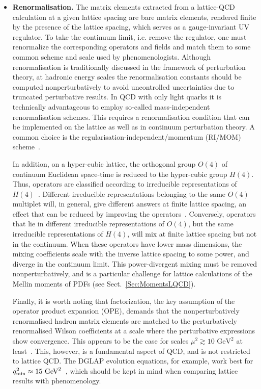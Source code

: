 \begin{itemize}
\item {\bfseries Renormalisation.} The matrix elements extracted from a 
lattice-QCD calculation at a given lattice spacing are bare matrix elements,
rendered finite by the presence of the lattice spacing, which serves
as a gauge-invariant UV regulator. To take the continuum limit,
i.e. remove the regulator, one must renormalize the corresponding
operators and fields and match them to some common scheme and scale used 
by phenomenologists. Although renormalisation is traditionally
discussed in the framework of perturbation theory, at hadronic energy
scales the renormalisation constants should be computed
nonperturbatively to avoid uncontrolled uncertainties due to 
truncated perturbative results.
%
In QCD with only light quarks it is technically
advantageous to employ so-called mass-independent renormalisation
schemes.
%
This requires a renormalisation condition that can be
implemented on the lattice as well as in continuum perturbation
theory. A common choice is the regularisation-independent/momentum (RI/MOM) 
scheme~\cite{Martinelli:1994ty}.

In addition, on a hyper-cubic lattice, the orthogonal group $O(4)$ of
continuum Euclidean space-time is reduced to the hyper-cubic group
$H(4)$.
%
Thus, operators are classified according to irreducible
representations of $H(4)$~\cite{Gockeler:1996mu}.
%
Different
irreducible representations belonging to the same $O(4)$ multiplet
will, in general, give different answers at finite lattice spacing, an
effect that can be reduced by improving the
operators~\cite{Gockeler:2004wp}.
%
Conversely, operators that lie in
different irreducible representations of $O(4)$, but the same irreducible
representations of $H(4)$, will mix at finite lattice spacing but not
in the continuum. When these operators have lower mass dimensions,
the mixing coefficients scale with the inverse lattice spacing to some
power, and diverge in the continuum limit.
%
This power-divergent mixing
must be removed nonperturbatively, and is a particular challenge for
lattice calculations of the Mellin moments of PDFs (see
Sect.~\ref{Sec:MomentsLQCD}).

Finally, it is worth noting that factorization, the key assumption of
the operator product expansion (OPE), demands that the nonperturbatively 
renormalised hadron matrix elements are matched to the perturbatively 
renormalised Wilson coefficients at a scale where the perturbative 
expressions show convergence. This appears to be
the case for scales $\mu^2 \gtrsim 10\mbox{ GeV}^2$ at
least~\cite{Gockeler:2010yr}. This, however, is a fundamental aspect
of QCD, and is not restricted to lattice QCD. The DGLAP evolution equations,
for example, work best for $q^2_{\rm min} \approx
15\mbox{ GeV}^2$~\cite{Abramowicz:2015mha}, which should be kept in
mind when comparing lattice results with phenomenology.


\end{itemize}
